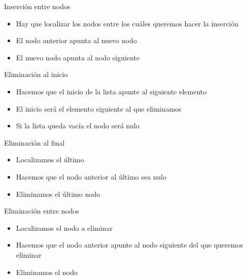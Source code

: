 \documentclass{beamer}
\begin{document}
\begin{frame}{Inserci\'on entre nodos}
	\begin{itemize}
		\item Hay que localizar los nodos entre los cu\'ales queremos hacer la inserci\'on
		\item El nodo anterior apunta al nuevo nodo
		\item El nuevo nodo apunta al nodo siguiente
	\end{itemize}
\end{frame}

\begin{frame}{Eliminaci\'on al inicio}
	\begin{itemize}
		\item Hacemos que el inicio de la lista apunte al siguiente elemento
		\item El inicio ser\'a el elemento siguiente al que eliminamos
		\item Si la lista queda vacía el nodo será nulo
	\end{itemize}
\end{frame}

\begin{frame}{Eliminaci\'on al final}
	\begin{itemize}
		\item Localizamos el \'ultimo
		\item Hacemos que el nodo anterior al \'ultimo sea nulo
		\item Eliminamos el \'ultimo nodo
	\end{itemize}
\end{frame}

\begin{frame}{Eliminaci\'on entre nodos}
	\begin{itemize}
		\item Localizamos el nodo a eliminar
		\item Hacemos que el nodo anterior apunte al nodo siguiente del que queremos eliminar
		\item Eliminamos el nodo
	\end{itemize}
\end{frame}
\end{document}
